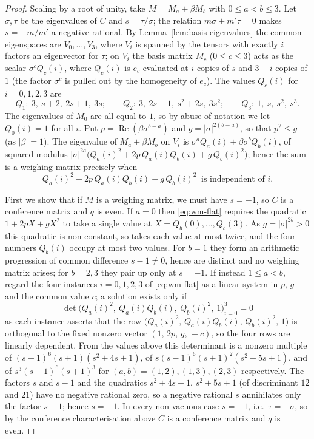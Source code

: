 \documentclass[10pt,a4paper]{amsart}
\begin{document}
\begin{proof}
Scaling by a root of unity, take $M = M_a+\beta M_b$
with $0\le a<b\le3$.  Let $\sigma,\tau$ be the
eigenvalues of $C$ and $s=\tau/\sigma$; the relation $m\sigma+m'\tau=0$ makes
$s=-m/m'$ a negative rational.  By Lemma~\ref{lem:basis-eigenvalues} the common
eigenspaces are $V_0,\dots,V_3$, where $V_i$ is spanned by the tensors with
exactly $i$ factors an eigenvector for $\tau$; on $V_i$ the basis matrix $M_c$
($0\le c\le3$) acts as the scalar $\sigma^{c}Q_c(i)$, where $Q_c(i)$ is $e_c$
evaluated at $i$ copies of $s$ and $3-i$ copies of $1$ (the factor $\sigma^{c}$ is
pulled out by the homogeneity of $e_c$).  The values $Q_c(i)$ for $i=0,1,2,3$ are
\[
  Q_1:\ 3,\ s{+}2,\ 2s{+}1,\ 3s; \qquad
  Q_2:\ 3,\ 2s{+}1,\ s^2{+}2s,\ 3s^2; \qquad
  Q_3:\ 1,\ s,\ s^2,\ s^3.
\]
The eigenvalues of $M_{0}$ are all equal to $1$, so by abuse of notation we let $Q_{0}(i) = 1$ for all $i$. Put $p=\operatorname{Re}(\beta\sigma^{b-a})$ and $g=|\sigma|^{2(b-a)}$, so that
$p^2\le g$ (as $|\beta|=1$).  The eigenvalue of $M_a+\beta M_b$ on $V_i$ is
$\sigma^{a}Q_a(i)+\beta\sigma^{b}Q_b(i)$, of squared modulus
$|\sigma|^{2a}\bigl(Q_a(i)^2+2p\,Q_a(i)Q_b(i)+g\,Q_b(i)^2\bigr)$; hence the sum is
a weighing matrix precisely when
\begin{equation}\label{eq:wm-flat}
  Q_a(i)^2+2p\,Q_a(i)Q_b(i)+g\,Q_b(i)^2\ \text{ is independent of } i.
\end{equation}

First we show that if $M$ is a weighing matrix, we must have $s=-1$, so $C$ is a conference matrix and
$q$ is even.  If $a=0$ then 
\eqref{eq:wm-flat} requires the
quadratic $1+2pX+gX^2$ to take a single value at $X=Q_b(0),\dots,Q_b(3)$.  As
$g=|\sigma|^{2b}>0$ this quadratic is non-constant, so takes each value at most
twice, and the four numbers $Q_b(i)$ occupy at most two values.  For
$b=1$ they form an arithmetic progression of common difference $s-1\neq0$, hence
are distinct and no weighing matrix arises; for $b=2,3$ they pair up only at
$s=-1$.  If instead $1\le a<b$, regard the four instances $i=0,1,2,3$ of
\eqref{eq:wm-flat} as a linear system in $p$, $g$ and the common value $c$; a
solution exists only if
\[
  \det\bigl(Q_a(i)^2,\ Q_a(i)Q_b(i),\ Q_b(i)^2,\ 1\bigr)_{i=0}^{3}=0
\]
as each instance asserts that the row $\bigl(Q_a(i)^2,\,Q_a(i)Q_b(i),\,Q_b(i)^2,\,1\bigr)$
is orthogonal to the fixed nonzero vector $(1,\,2p,\,g,\,-c)$, so the four rows are
linearly dependent.  From the values above this determinant is a nonzero multiple of
$(s{-}1)^6(s{+}1)(s^2{+}4s{+}1)$, of $s(s{-}1)^6(s{+}1)^2(s^2{+}5s{+}1)$, and of
$s^3(s{-}1)^6(s{+}1)^3$ for $(a,b)=(1,2),(1,3),(2,3)$ respectively.  The factors
$s$ and $s-1$ and the quadratics $s^2+4s+1$, $s^2+5s+1$ (of discriminant $12$
and $21$) have no negative rational zero, so a negative rational $s$ annihilates
only the factor $s+1$; hence $s=-1$.  In every
non-vacuous case $s=-1$, i.e.\ $\tau=-\sigma$, so by the conference
characterisation above $C$ is a conference matrix and $q$ is even.


\end{proof}
\end{document}

